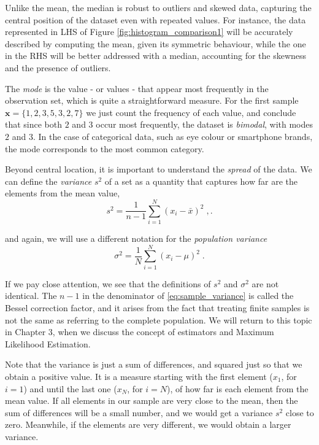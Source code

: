 \documentclass{book}
\begin{document}
Unlike the mean, the median is robust to outliers and skewed data, capturing the central position of the dataset even with repeated values. For instance, the data represented in LHS of Figure \ref{fig:histogram_comparison1} will be accurately described by computing the mean, given its symmetric behaviour, while the one in the RHS will be better addressed with a median, accounting for the skewness and the presence of outliers.

\medskip

The \textit{mode} is the value - or values - that appear most frequently in the observation set, which is quite a straightforward measure. For the first sample $\textbf{x} = \{1, 2, 3, 5, 3, 2, 7\}$ we just count the frequency of each value, and conclude that since both $2$ and $3$ occur most frequently, the dataset is \textit{bimodal}, with modes $2$ and $3$. In the case of categorical data, such as eye colour or smartphone brands, the mode corresponds to the most common category.

\medskip

Beyond central location, it is important to understand the \textit{spread} of the data. We can define the \textit{variance} $s^2$ of a set as a quantity that captures how far are the elements from the mean value,
\begin{equation}
	s^2 = \frac{1}{n - 1} \sum_{i = 1}^{N} (x_{i} - \bar{x})^{2} \; ,
	\label{eq:sample_variance}. 
\end{equation}

and again, we will use a different notation for the \textit{population variance}
\begin{equation}
	\sigma^2 = \frac{1}{N} \sum_{i=1}^{N} (x_i - \mu)^2 \; .
	\label{eq:population_variance}
\end{equation}

If we pay close attention, we see that the definitions of $s^2$ and $\sigma^{2}$ are not identical. The $n-1$ in the denominator of \eqref{eq:sample_variance} is called the Bessel correction factor, and it arises from the fact that treating finite samples is not the same as referring to the complete population. We will return to this topic in Chapter 3, when we discuss the concept of estimators and Maximum Likelihood Estimation.

\medskip

Note that the variance is just a sum of differences, and squared just so that we obtain a positive value. It is a measure starting with the first element ($x_1$, for $i = 1$) and until the last one ($x_N$, for $i = N$), of how far is each element from the mean value. If all elements in our sample are very close to the mean, then the sum of differences will be a small number, and we would get a variance $s^2$ close to zero. Meanwhile, if the elements are very different, we would obtain a larger variance. 
\end{document}
